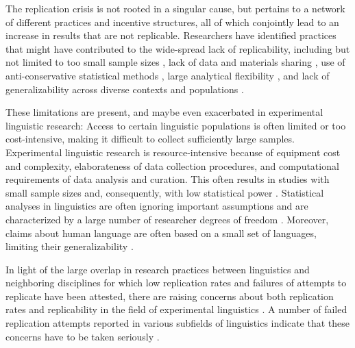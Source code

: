\documentclass[cm,linguex]{glossa}
\begin{document}
The replication crisis is not rooted in a singular cause, but pertains to a network of different practices and incentive structures, all of which conjointly lead to an increase in results that are not replicable. Researchers have identified practices that might have contributed to the wide-spread lack of replicability, including but not limited to too small sample sizes \citep[e.g.,][]{button2013power, vasishth_statistical_2018}, lack of data and materials sharing \citep[e.g.,][]{nosek2015promoting}, use of anti-conservative statistical methods \citep[e.g.,][]{yarkoni2019generalizability}, large analytical flexibility \citep[e.g.,][]{simmons2011false}, and lack of generalizability across diverse contexts and populations \citep{henrich2010weirdest}.

These limitations are present, and maybe even exacerbated in experimental linguistic research: Access to certain linguistic populations is often limited or too cost-intensive, making it difficult to collect sufficiently large samples. Experimental linguistic research is resource-intensive because of equipment cost and complexity, elaborateness of data collection procedures, and computational requirements of data analysis and curation. This often results in studies with small sample sizes and, consequently, with low statistical power \citep[e.g.,][]{casillas2021interlingual, kirby2018mixed}. Statistical analyses in linguistics are often ignoring important assumptions \citep[e.g.,][]{winter2021independence} and are characterized by a large number of researcher degrees of freedom \citep{roettger2019researcher}. Moreover, claims about human language are often based on a small set of languages, limiting their generalizability \citep[e.g.,][]{levisen2019biases, majid2010language}.

In light of the large overlap in research practices between linguistics and neighboring disciplines for which low replication rates and failures of attempts to replicate have been attested, there are raising concerns about both replication rates and replicability in the field of experimental linguistics \citep[e.g.,][]{marsden_replication_2018, roettger_toward_2019, sonning2021replication}. A number of failed replication attempts reported in various subfields of linguistics indicate that these concerns have to be taken seriously \citep[e.g.,][]{chen_chinese_2007, morey2021pre, nieuwland_large-scale_2018, papesh_just_2015, stack_failure_2018, vasishth_statistical_2018, westbury_implicit_2018, jager_interference_2020, nieuwland_anticipating_2020}.
\end{document}
